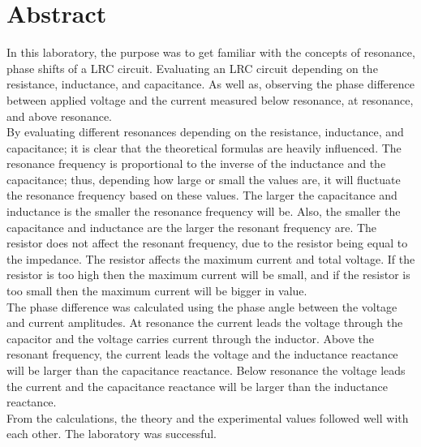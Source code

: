 \documentclass[11pt]{article}
\begin{document}
\section*{Abstract}
In this laboratory, the purpose was to get familiar with the concepts of resonance, phase shifts of a LRC circuit. Evaluating an LRC circuit depending on the resistance, inductance, and capacitance. As well as, observing the phase difference between applied voltage and the current measured below resonance, at resonance, and above resonance. \\
By evaluating different resonances depending on the resistance, inductance, and capacitance; it is clear that the theoretical formulas are heavily influenced. The resonance frequency is proportional to the inverse of the inductance and the capacitance; thus, depending how large or small the values are, it will fluctuate the resonance frequency based on these values. The larger the capacitance and inductance is the smaller the resonance frequency will be. Also, the smaller the capacitance and inductance are the larger the resonant frequency are. The resistor does not affect the resonant frequency, due to the resistor being equal to the impedance. The resistor affects the maximum current and total voltage. If the resistor is too high then the maximum current will be small, and if the resistor is too small then the maximum current will be bigger in value.\\
The phase difference was calculated using the phase angle between the voltage and current amplitudes. At resonance the current leads the voltage through the capacitor and the voltage carries current through the inductor. Above the resonant frequency, the current leads the voltage and the inductance reactance will be larger than the capacitance reactance. Below resonance the voltage leads the current and the capacitance reactance will be larger than the inductance reactance.\\
From the calculations, the theory and the experimental values followed well with each other. The laboratory was successful. 
\end{document}

